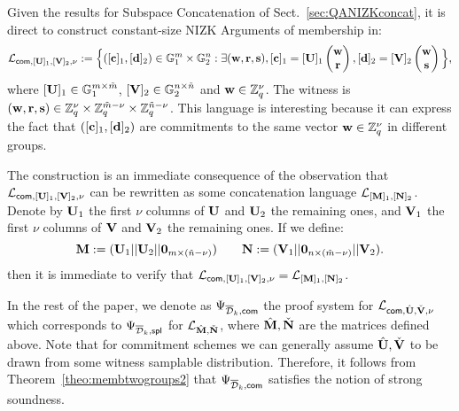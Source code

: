 
Given the results for Subspace Concatenation of 
Sect.~\ref{sec:QANIZKconcat}, it is direct to construct constant-size NIZK Arguments of membership in:
$$\mathcal{L}_{\mathsf{com},[\mathbf{{U}}]_1,[\mathbf{{V}}]_2,\nu}:=\Big\{([\mathbf{c}]_1,[\mathbf{d}]_2) \in \mathbb{G}_1^{m} \times \mathbb{G}_2^{n}:  \exists (\mathbf{w},\mathbf{r},\mathbf{s}),  
[\mathbf{c}]_1= [\mathbf{{U}}]_1 \begin{pmatrix} \mathbf{w}\\ 
 \mathbf{r} \end{pmatrix}, [\mathbf{d}]_2=[\mathbf{{V}}]_2 \begin{pmatrix} \mathbf{w} \\ \mathbf{s} \end{pmatrix}\Big\},$$
where $[\mathbf{{U}}]_1\in \mathbb{G}_1^{m \times \tilde{m}}$, 
$[\mathbf{{V}}]_2 \in \mathbb{G}_2^{n \times \tilde{n}}$
and $\mathbf{w} \in \mathbb{Z}_q^{\nu}$. The witness is 
 $(\mathbf{w},\mathbf{r},\mathbf{s}) \in \mathbb{Z}_q^{\nu} \times \mathbb{Z}_q^{\tilde{m}-\nu} \times \mathbb{Z}_q^{\tilde{n}-\nu}$. This language is interesting because it can express the fact that 
$([\mathbf{c}]_1,[\mathbf{d}]_2)$ are commitments to the same vector 
$\mathbf{w} \in \mathbb{Z}_q^{\nu}$ in different groups.
 
The construction is an immediate consequence of the observation 
that $\mathcal{L}_{\mathsf{com},[\mathbf{{U}}]_1,[\mathbf{{V}}]_2,\nu}$  can be rewritten as some concatenation language $\mathcal{L}_{[\mathbf{{M}}]_1,[\mathbf{{N}}]_2}$.
Denote by $\mathbf{{U}}_1$ the first $\nu$ columns of $\mathbf{{U}}$  and $\mathbf{{U}}_2$ the remaining ones, and $\mathbf{{V}}_1$ the first $\nu$ columns of $\mathbf{{V}}$ and $\mathbf{{V}}_2$ the remaining ones. If we define: 
\begin{equation*}
 \mathbf{{M}} := (\mathbf{{U}}_1||\mathbf{{U}}_2||\mathbf{{0}}_{m\times (\tilde{n}-\nu)}) \qquad
\mathbf{{N}} := (\mathbf{{V}}_1||\mathbf{{0}}_{n\times (\tilde{m}- \nu)}||\mathbf{{V}}_2).
\end{equation*}
then it is immediate to verify that $\mathcal{L}_{\mathsf{com},[\mathbf{{U}}]_1,[\mathbf{{V}}]_2,\nu}=\mathcal{L}_{[\mathbf{{M}}]_1,[\mathbf{{N}}]_2}$.

In the rest of the paper, we denote as $\Psi_{\overline{\mathcal{D}}_k,\mathsf{com}}$ the proof 
system for $\mathcal{L}_{\mathsf{com},{\hat{\mathbf{{U}}}},\check{\mathbf{{V}}},\nu}$ which corresponds to $\Psi_{\overline{\mathcal{D}}_k,\mathsf{spl}}$ for $\mathcal{L}_{{\hat{\mathbf{{M}}}},\check{\mathbf{{N}}}}$, where ${\hat{\mathbf{{M}}}},\check{\mathbf{{N}}}$ are the matrices defined above. Note that for commitment schemes we can generally assume ${\hat{\mathbf{{U}}}},\check{\mathbf{{V}}}$ to be drawn from some witness samplable distribution. Therefore, it follows from Theorem~\ref{theo:membtwogroups2} that $\Psi_{\overline{\mathcal{D}}_k,\mathsf{com}}$ satisfies the notion of strong soundness.  

